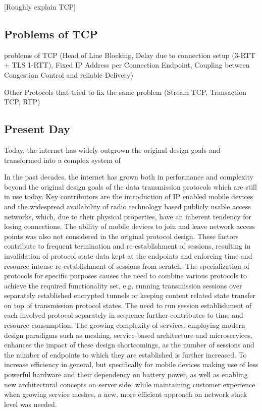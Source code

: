 [Roughly explain TCP]

\subsection{Problems of TCP}

problems of TCP (Head of Line Blocking, Delay due to connection setup (3-RTT + TLS 1-RTT), Fixed IP Address per Connection Endpoint, Coupling between Congestion Control and reliable Delivery)

Other Protocols that tried to fix the same problem (Stream TCP, Transaction TCP, RTP)

\subsection{Present Day}

Today, the internet has widely outgrown the original design goals and transformed into a complex system of 

In the past decades, the internet has grown both in performance and complexity beyond the original design goals of the data transmission protocols which are still in use today.
Key contributors are the introduction of IP enabled mobile devices and the widespread availability of radio technology based publicly usable access networks, which, due to their physical properties, have an inherent tendency for losing connections. The ability of mobile devices to join and leave network access points was also not considered in the original protocol design. These factors contribute to frequent termination and re-establishment of sessions, resulting in invalidation of protocol state data kept at the endpoints and enforcing time and resource intense re-establishment of sessions from scratch.
The specialization of protocols for specific purposes causes the need to combine various protocols to achieve the required functionality set, e.g. running transmission sessions over separately established encrypted tunnels or keeping content related state transfer on top of transmission protocol states. The need to run session establishment of each involved protocol separately in sequence further contributes to time and resource consumption.
The growing complexity of services, employing modern design paradigms such as meshing, service-based architecture and microservices, enhances the impact of these design shortcomings, as the number of sessions and the number of endpoints to which they are established is further increased. To increase efficiency in general, but specifically for mobile devices making use of less powerful hardware and their dependency on battery power, as well as enabling new architectural concepts on server side, while maintaining customer experience when growing service meshes, a new, more efficient approach on network stack level was needed.
 
